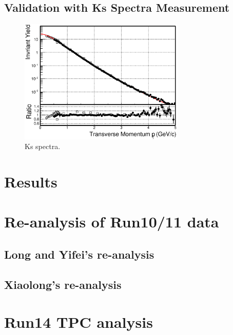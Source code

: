 \documentclass[a4paper]{article}
\begin{document}
\subsection{Validation with Ks Spectra Measurement}

\begin{figure}
\centering
\includegraphics[width=0.7\textwidth]{fig/Ks_spectra_PtCut_0.eps}
\caption{\label{fig:Ks_spectra}Ks spectra.}
\end{figure}

\section{\label{results}Results}

\section{\label{Run1011}Re-analysis of Run10/11 data}

\subsection{Long and Yifei's re-analysis}

\subsection{Xiaolong's re-analysis}

\section{\label{Run14TPC}Run14 TPC analysis}



\end{document}
